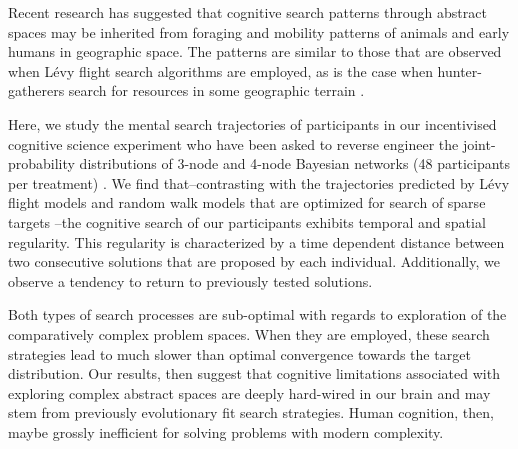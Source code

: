 Recent research \cite{baronchelli2013levy} has suggested that cognitive search patterns through abstract spaces \cite{rhodes2007human,radicchi2012rationality,radicchi2012evolution} may be inherited from foraging and mobility patterns of animals \cite{viswanathan1996levy,ramos2004levy,reynolds2007displaced} and early humans \cite{gonzalez2008understanding,song2010modelling,rhee2011levy} in geographic space. The patterns are similar to those that are observed when L\'evy flight search algorithms are employed, as is the case when hunter-gatherers search for resources in some geographic terrain \cite{brown2007levy,raichlen2014evidence}. 

Here, we study the mental search trajectories of participants in our incentivised cognitive science experiment who have been asked to reverse engineer the joint-probability distributions of 3-node and 4-node Bayesian networks (48 participants per treatment) \cite{steyvers2003inferring,pearl2009causality}. We find that--contrasting with the trajectories predicted by L\'evy flight models and random walk models that are optimized for search of sparse targets \cite{viswanathan1999optimizing,edwards2007revisiting,song2010modelling,viswanathan2011physics}--the cognitive search of our participants exhibits temporal and spatial regularity. This regularity is characterized by a time dependent distance between two consecutive solutions that are proposed by each individual.  Additionally, we observe a tendency to return to previously tested solutions. 

Both types of search processes are sub-optimal with regards to exploration of the comparatively complex problem spaces. When they are employed, these search strategies lead to much slower than optimal convergence towards the target distribution. Our results, then suggest that cognitive limitations associated with exploring complex abstract spaces are deeply hard-wired in our brain and may stem from previously evolutionary fit search strategies.  Human cognition, then, maybe grossly inefficient for solving problems with modern complexity.
